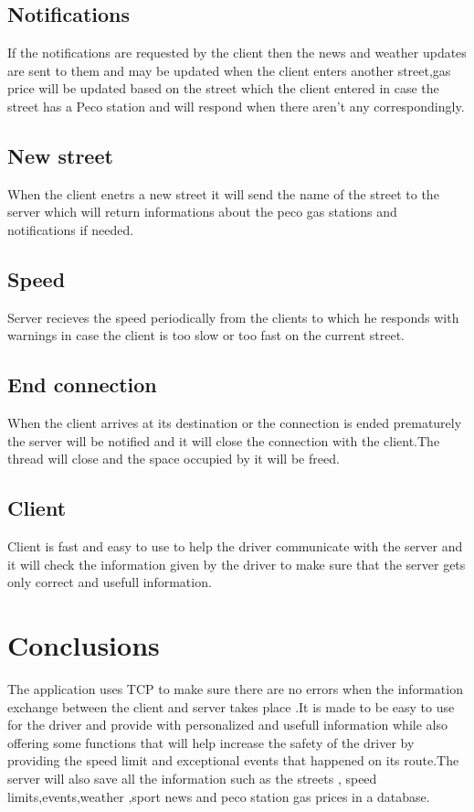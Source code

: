\documentclass{article}
\begin{document}
\subsection{Notifications}
If the notifications are requested by the client then the news and weather updates are sent to them and may be updated when the client enters another street,gas price will be updated based on the street which the client entered in case the street has a Peco station and will respond when there aren't any correspondingly.
\subsection{New street}
When the client enetrs a new street it will send the name of the street to the server which will return informations about the peco gas stations and notifications if needed.
\subsection{Speed}
Server recieves the speed periodically from the clients to which he responds with warnings in case the client is too slow or too fast on the current street.
\subsection{End connection}
When the client arrives at its destination or the connection is ended prematurely the server will be notified and it will close the connection with the client.The thread will close and the space occupied by it will be freed.
\subsection{Client}
Client is fast and easy to use to help the driver communicate with the server and it will check the information given by the driver to make sure that the server gets only correct and usefull information. 
\section{\textbf{Conclusions}}
The application uses TCP to make sure there are no errors when the information exchange between the client and server takes place .It is made to be easy to use for the driver and provide with personalized and usefull information while also offering some functions that will help increase the safety of the driver by providing the speed limit and exceptional events that happened on its route.The server will also save all the information such as the streets , speed limits,events,weather ,sport news and peco station gas prices in a database. 
\end{document}
